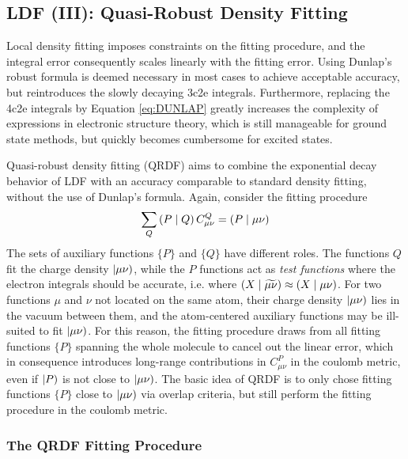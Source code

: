 
\subsection{LDF (III): Quasi-Robust Density Fitting}

Local density fitting imposes constraints on the fitting procedure, and the integral error consequently scales linearly with the fitting error. Using Dunlap's robust formula is deemed necessary in most cases to achieve acceptable accuracy, but reintroduces the slowly decaying 3c2e integrals. Furthermore, replacing the 4c2e integrals by Equation \ref{eq:DUNLAP} greatly increases the complexity of expressions in electronic structure theory, which is still manageable for ground state methods, but quickly becomes cumbersome for excited states.

Quasi-robust density fitting (QRDF) \cite{Tew2018} aims to combine the exponential decay behavior of LDF with an accuracy comparable to standard density fitting, without the use of Dunlap's formula. Again, consider the fitting procedure 
\begin{equation}
\sum_Q \left( P \mid Q \right) C^Q_{\mu\nu} = \left( P \mid \mu\nu \right)
\end{equation}
\noindent The sets of auxiliary functions $\{P\}$ and $\{Q\}$ have different roles. The functions $Q$ fit the charge density $\left\lvert \mu\nu \right)$, while the $P$ functions act as \emph{test functions} where the electron integrals should be accurate, i.e. where $\left( X \mid \widetilde{\mu\nu} \right) \approx \left( X \mid \mu\nu \right)$. For two functions $\mu$ and $\nu$ not located on the same atom, their charge density $\left\lvert \mu\nu \right)$ lies in the vacuum between them, and the atom-centered auxiliary functions may be ill-suited to fit $\left\lvert \mu\nu \right)$. For this reason, the fitting procedure draws from all fitting functions $\{P\}$ spanning the whole molecule to cancel out the linear error, which in consequence introduces long-range contributions in $C_{\mu\nu}^P$ in the coulomb metric, even if $\left\lvert P \right)$ is not close to $\left\lvert \mu\nu \right)$. 
The basic idea of QRDF is to only chose fitting functions $\{P\}$ close to $\left\lvert \mu\nu \right)$ via overlap criteria, but still perform the fitting procedure in the coulomb metric.

\subsubsection{The QRDF Fitting Procedure}

